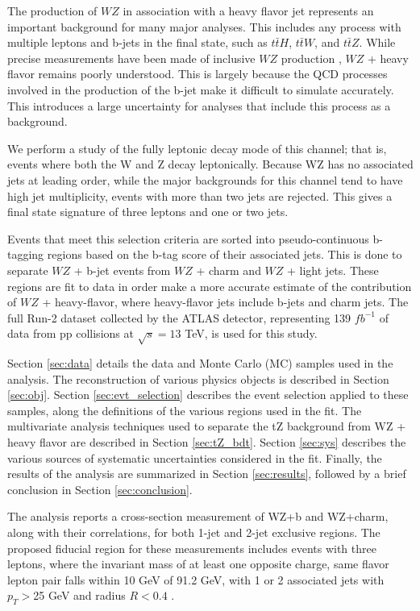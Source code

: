 
The production of $WZ$ in association with a heavy flavor jet represents an important background for many major analyses. This includes any process with multiple leptons and b-jets in the final state, such as $t\bar{t}H$, $t\bar{t}W$, and $t\bar{t}Z$. While precise measurements have been made of inclusive $WZ$ production \cite{WZ_36}, $WZ$ + heavy flavor remains poorly understood. This is largely because the QCD processes involved in the production of the b-jet make it difficult to simulate accurately. This introduces a large uncertainty for analyses that include this process as a background.  

We perform a study of the fully leptonic decay mode of this channel; that is, events where both the W and Z decay leptonically. Because WZ has no associated jets at leading order, while the major backgrounds for this channel tend to have high jet multiplicity, events with more than two jets are rejected. This gives a final state signature of three leptons and one or two jets.

Events that meet this selection criteria are sorted into pseudo-continuous b-tagging regions based on the b-tag score of their associated jets. This is done to separate $WZ$ + b-jet events from $WZ$ + charm and $WZ$ + light jets. These regions are fit to data in order make a more accurate estimate of the contribution of $WZ$ + heavy-flavor, where heavy-flavor jets include b-jets and charm jets. The full Run-2 dataset collected by the ATLAS detector, representing 139 $fb^{-1}$ of data from pp collisions at $\sqrt{s} = 13$ TeV, is used for this study.

Section \ref{sec:data} details the data and Monte Carlo (MC) samples used in the analysis. The reconstruction of various physics objects is described in Section \ref{sec:obj}. Section \ref{sec:evt_selection} describes the event selection applied to these samples, along the definitions of the various regions used in the fit. The multivariate analysis techniques used to separate the tZ background from WZ + heavy flavor are described in Section \ref{sec:tZ_bdt}. Section \ref{sec:sys} describes the various sources of systematic uncertainties considered in the fit. Finally, the results of the analysis are summarized in Section \ref{sec:results}, followed by a brief conclusion in Section \ref{sec:conclusion}.

The analysis reports a cross-section measurement of WZ+b and WZ+charm, along with their correlations, for both 1-jet and 2-jet exclusive regions. The proposed fiducial region for these measurements includes events with three leptons, where the invariant mass of at least one opposite charge, same flavor lepton pair falls within 10 GeV of 91.2 GeV, with 1 or 2 associated jets with $p_T>$25 GeV and radius $R<0.4$ . 

